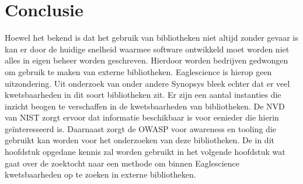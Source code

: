 
\section{Conclusie}\label{sec:soupTheorieconclusie}
Hoewel het bekend is dat het gebruik van bibliotheken niet altijd zonder gevaar is kan er door de huidige snelheid waarmee software ontwikkeld moet worden niet alles in eigen beheer worden geschreven. Hierdoor worden bedrijven gedwongen om gebruik te maken van externe bibliotheken. Eaglescience is hierop geen uitzondering. Uit onderzoek van onder andere Synopsys bleek echter dat er veel kwetsbaarheden in dit soort bibliotheken zit. Er zijn een aantal instanties die inzicht beogen te verschaffen in de kwetsbaarheden van bibliotheken. De NVD van NIST zorgt ervoor dat informatie beschikbaar is voor eenieder die hierin geïnteresseerd is. Daarnaast zorgt de OWASP voor awareness en tooling die gebruikt kan worden voor het onderzoeken van deze bibliotheken. De in dit hoofdstuk opgedane kennis zal worden gebruikt in het volgende hoofdstuk wat gaat over de zoektocht naar een methode om binnen Eaglescience kwetsbaarheden op te zoeken in externe bibliotheken.
